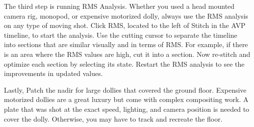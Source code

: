 \begin{fullwidth}




\clearpage
The third step is running RMS Analysis. Whether you used a head mounted camera rig, monopod, or expensive motorized dolly, always use the RMS analysis on any type of moving shot. Click RMS, located to the left of Stitch in the AVP timeline, to start the analysis. Use the cutting cursor to separate the timeline into sections that are similar visually and in terms of RMS. For example, if there is an area where the RMS values are high, cut it into a section. Now re-stitch and optimize each section by selecting its state. Restart the RMS analysis to see the improvements in updated values.


Lastly, Patch the nadir for large dollies that covered the ground floor. Expensive motorized dollies are a great luxury but come with complex compositing work. A plate that was shot at the exact speed, lighting, and camera position is needed to cover the dolly. Otherwise, you may have to track and recreate the floor.


\clearpage
\end{fullwidth}